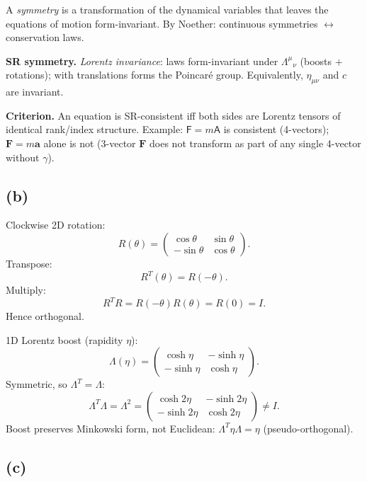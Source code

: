 \documentclass[11pt]{article}
\newcommand{\fourv}[1]{\mathsf{#1}}
\begin{document}
A \emph{symmetry} is a transformation of the dynamical variables that leaves the equations of motion form-invariant. By Noether: continuous symmetries $\leftrightarrow$ conservation laws.

\textbf{SR symmetry.} \emph{Lorentz invariance}: laws form-invariant under $\Lambda^\mu{}_\nu$ (boosts $+$ rotations); with translations forms the Poincaré group. Equivalently, $\eta_{\mu\nu}$ and $c$ are invariant.

\textbf{Criterion.} An equation is SR-consistent iff both sides are Lorentz tensors of identical rank/index structure. Example: $\fourv F = m\fourv A$ is consistent (4-vectors); $\bm F=m\bm a$ alone is not (3-vector $\bm F$ does not transform as part of any single 4-vector without $\gamma$).

\subsection*{(b)}

Clockwise 2D rotation:
\[ R(\theta) = \begin{pmatrix}\cos\theta & \sin\theta\\ -\sin\theta & \cos\theta\end{pmatrix}. \]
Transpose:
\[ R^T(\theta) = R(-\theta). \]
Multiply:
\[ R^T R = R(-\theta)R(\theta) = R(0) = I. \]
Hence orthogonal.

1D Lorentz boost (rapidity $\eta$):
\[ \Lambda(\eta) = \begin{pmatrix}\cosh\eta & -\sinh\eta\\ -\sinh\eta & \cosh\eta\end{pmatrix}. \]
Symmetric, so $\Lambda^T=\Lambda$:
\[ \Lambda^T\Lambda = \Lambda^2 = \begin{pmatrix}\cosh 2\eta & -\sinh 2\eta\\ -\sinh 2\eta & \cosh 2\eta\end{pmatrix}\neq I. \]
Boost preserves Minkowski form, not Euclidean: $\Lambda^T\eta\Lambda = \eta$ (pseudo-orthogonal).


\subsection*{(c)}
\end{document}
